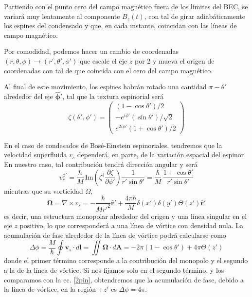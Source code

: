 \documentclass[twocolumn]{article}
\numberwithin{equation}{section}
\newcommand{\0}{\textcolor{gray}{0}}
\newcommand{\ro}{\nabla\times}
\newcommand{\rv}{\mathbf{r}}
\newcommand{\rhat}{\hat{\rv}}
\newcommand{\n}[1]{\mathbf{#1}}
\begin{document}
	Partiendo con el punto cero del campo magnético fuera de los límites del BEC, se variará muy lentamente al componente $B_z(t)$, con tal de girar adiabáticamente los espines del condensado y que, en cada instante, coincidan con las líneas de campo magnético.
	
	Por comodidad, podemos hacer un cambio de coordenadas $(r,\theta,\phi) \rightarrow (r',\theta',\phi')$ que escale el eje $z$ por 2 y mueva el origen de coordenadas con tal de que coincida con el cero del campo magnético.
	
	Al final de este movimiento, los espines habrán rotado una cantidad $\pi - \theta'$ alrededor del eje $\hat{\mathbf{\phi}} '$, tal que la textura espinorial será
	\begin{equation}
		\zeta(\theta',\phi') = \begin{pmatrix}
			(1 - \cos\theta')/2\\
			-e^{i\phi'} (\sin\theta')/\sqrt{2}\\
			e^{2i\phi'} (1 + \cos\theta')/2
		\end{pmatrix}
	\end{equation}
	
	En el caso de condesados de Bosé-Einstein espinoriales, tendremos que la velocidad superfluida $v_s$ dependerá, en parte, de la variación espacial del espinor. En nuestro caso, tal contribución tendrá dirección angular y será
	\begin{equation}
		v_s^{\phi'} = \frac{\hbar}{M}\,\mathrm{Im}\!\left(\zeta^\dagger \frac{\partial\zeta}{\partial\phi'}\right)\frac{1}{r'\sin\theta'} = \frac{\hbar}{M}\,\frac{1+\cos\theta'}{r'\sin\theta'}
	\end{equation}
	mientras que su vorticidad $\Omega$,
	\begin{equation}
		\n{\Omega} = \ro v_s = -\frac{\hbar}{Mr'^2}\rhat' + \frac{4\pi\hbar}{M}\delta(x')\delta(y')\Theta(z')\rhat'
	\end{equation}
	es decir, una estructura monopolar alrededor del origen y una línea singular en el eje $z$ positivo, lo que corresponderá a una línea de vórtice con densidad nula. La acumulación de fase alrededor de la línea de vórtice podrá calcularse como
	\begin{equation*}
		\Delta \phi = \frac{M}{\hbar} \oint \n{v}_s \cdot d\n{l} = \iint \n{\Omega} \cdot d\n{A} =  - 2 \pi (1 - \cos\theta') + 4 \pi \Theta(z')
	\end{equation*}
	donde el primer término corresponde a la contribución del monopolo y el segundo a la de la línea de vórtice. Si nos fijamos solo en el segundo término, y los comparamos con la ec. \ref{2pin}, obtendremos que la acumulación de fase, debido a la línea de vórtice, en la región $+z'$ es $\Delta \phi = 4 \pi$.
	
\end{document}
